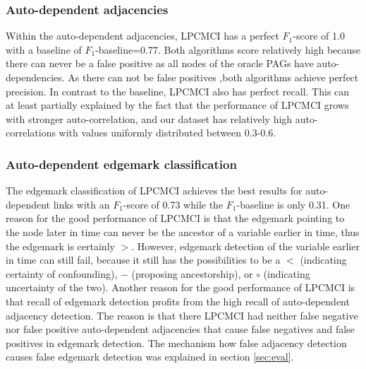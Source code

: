 \documentclass[conference]{IEEEtran}
\begin{document}



\subsubsection{Auto-dependent adjacencies}
Within the auto-dependent adjacencies, LPCMCI has a perfect $F_1$-score of 1.0 with a baseline of $F_1$-baseline=0.77. Both algorithms score relatively high because there can never be a false positive as all nodes of the oracle PAGs have auto-dependencies. As there can not be false positives ,both algorithms achieve perfect precision.
In contrast to the baseline, LPCMCI also has perfect recall. This can at least partially explained by the fact that the performance of LPCMCI grows with stronger auto-correlation\cite{gerhardus_high-recall_2021}, and our dataset has relatively high auto-correlations with values uniformly distributed between 0.3-0.6.

\subsubsection{Auto-dependent edgemark classification}
The edgemark classification of LPCMCI achieves the best results for auto-dependent links with an $F_1$-score of 0.73 while the $F_1$-baseline is only 0.31. One reason for the good performance of LPCMCI is that the edgemark pointing to the node later in time can never be the ancestor of a variable earlier in time, thus the edgemark is certainly $>$. 
However, edgemark detection of the variable earlier in time can still fail, because it still has the possibilities to be a $<$ (indicating certainty of confounding), $-$ (proposing ancestorship), or $\circ$ (indicating uncertainty of the two).
Another reason for the good performance of LPCMCI is that recall of edgemark detection profits from the high recall of auto-dependent adjacency detection.  The reason is that there LPCMCI had neither false negative nor false positive auto-dependent adjacencies that cause false negatives and false positives in edgemark detection. The mechanism how false adjacency detection causes false edgemark detection was explained in section \ref{sec:eval}.
\end{document}
